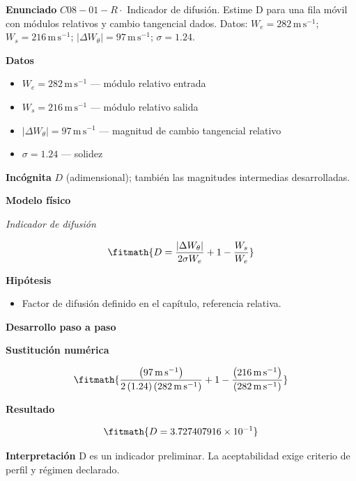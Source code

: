 \documentclass[10pt,openany]{book}
\begin{document}
\begin{tcolorbox}[title={Problema resuelto 1}, studiumworked, breakable]

\noindent\textbf{Enunciado}
\(C08-01-R \cdot\) Indicador de difusión. Estime D para una fila móvil con módulos relativos y cambio tangencial dados. Datos: \(W_e=282\, \mathrm{m}\,\mathrm{s}^{-1}\); \(W_s=216\, \mathrm{m}\,\mathrm{s}^{-1}\); \(|\Delta W_\theta|=97\, \mathrm{m}\,\mathrm{s}^{-1}\); \(\sigma=1.24\).

\noindent\textbf{Datos}
\begin{itemize}
\item $W_e = 282\,\mathrm{m}\,\mathrm{s}^{-1}$ — módulo relativo entrada
\item $W_s = 216\,\mathrm{m}\,\mathrm{s}^{-1}$ — módulo relativo salida
\item $|\Delta W_\theta| = 97\,\mathrm{m}\,\mathrm{s}^{-1}$ — magnitud de cambio tangencial relativo
\item $\sigma = 1.24$ — solidez
\end{itemize}

\noindent\textbf{Incógnita}
$D$ (adimensional); también las magnitudes intermedias desarrolladas.

\noindent\textbf{Modelo físico}

\noindent\textit{Indicador de difusión}

\[
\fitmath{D=\frac{|\Delta W_\theta|}{2 \sigma W_e} + 1 - \frac{W_s}{W_e}}
\]

\noindent\textbf{Hipótesis}
\begin{itemize}
\item Factor de difusión definido en el capítulo, referencia relativa.
\end{itemize}

\noindent\textbf{Desarrollo paso a paso}



\noindent\textbf{Sustitución numérica}

\[
\fitmath{\frac{\left(97\,\mathrm{m}\,\mathrm{s}^{-1}\right)}{2 \left(1.24\right) \left(282\,\mathrm{m}\,\mathrm{s}^{-1}\right)} + 1 - \frac{\left(216\,\mathrm{m}\,\mathrm{s}^{-1}\right)}{\left(282\,\mathrm{m}\,\mathrm{s}^{-1}\right)}}
\]

\noindent\textbf{Resultado}

\[
\fitmath{D=3.727407916\times10^{-1}}
\]

\noindent\textbf{Interpretación}
D es un indicador preliminar. La aceptabilidad exige criterio de perfil y régimen declarado.


\end{tcolorbox}
\end{document}
